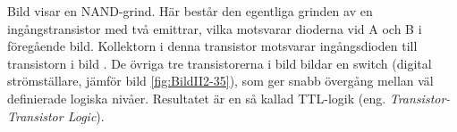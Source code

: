 
Bild  visar en NAND-grind.
Här består den egentliga grinden av en ingångstransistor med två emittrar,
vilka motsvarar dioderna vid A och B i föregående bild.
Kollektorn i denna transistor motsvarar ingångsdioden till transistorn i bild
.
De övriga tre transistorerna i bild  bildar en switch (digital strömställare, jämför bild \ref{fig:BildII2-35}),
som ger snabb övergång mellan väl definierade logiska nivåer.
Resultatet är en så kallad TTL-logik (eng. \emph{Transistor-Transistor Logic}).
